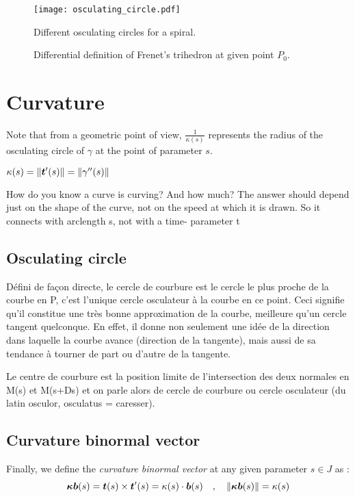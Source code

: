 \begin{figure}[t]
\begin{center}
\texttt{[image: osculating\_circle.pdf]}
\caption{Different osculating circles for a spiral.}
\label{fig:3_1}
\end{center}
\end{figure}

\begin{figure}[h]
     \centering
     \caption{Differential definition of Frenet's trihedron at given point $P_0$.}
     \label{}
\end{figure}

\section{Curvature}

Note that from a geometric point of view, $\frac{1}{\kappa(s)}$ represents the radius of the osculating circle of $\gamma$ at the point of parameter $s$.

$\kappa(s) = \|\boldsymbol{t}'(s)\| = \|\gamma''(s)\|$


How do you know a curve is curving?
And how much?
The answer should depend just on the
shape of the curve, not on the speed at
which it is drawn.
So it connects with
arclength s, not with a time-
parameter t

\subsection{Osculating circle}
Défini de façon directe, le cercle de courbure est le cercle le plus proche de la courbe en P, c'est l'unique cercle osculateur à la courbe en ce point. Ceci signifie qu'il constitue une très bonne approximation de la courbe, meilleure qu'un cercle tangent quelconque. En effet, il donne non seulement une idée de la direction dans laquelle la courbe avance (direction de la tangente), mais aussi de sa tendance à tourner de part ou d'autre de la tangente.

Le centre de courbure est la position limite de l'intersection des deux normales en M(s) et M(s+Ds) et on parle alors de cercle de courbure ou cercle osculateur (du latin osculor, osculatus = caresser).

\subsection{Curvature binormal vector}
Finally, we define the \emph{curvature binormal vector} at any given parameter $s \in J$ as :
\begin{equation}
\boldsymbol{\kappa b}(s) = \boldsymbol{t}(s) \times \boldsymbol{t}'(s) = \kappa(s)\cdot\boldsymbol{b}(s)
\quad,\quad
\|\boldsymbol{\kappa b}(s)\|= \kappa(s)
\end{equation}

